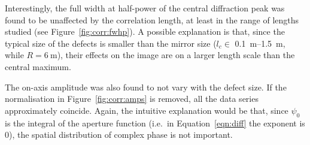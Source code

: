 \documentclass{article}
\begin{document}
Interestingly, the full width at half-power of the central diffraction peak was found to be unaffected by the correlation length, at least in the range of lengths studied (see Figure~\ref{fig:corr:fwhp}). A possible explanation is that, since the typical size of the defects is smaller than the mirror size ($l_c \in$ \SIrange{0.1}{1.5}{\metre}, while $R = \SI{6}{\metre}$), their effects on the image are on a larger length scale than the central maximum.

The on-axis amplitude was also found to not vary with the defect size. If the normalisation in Figure~\ref{fig:corr:amps} is removed, all the data series approximately coincide. Again, the intuitive explanation would be that, since $\psi_0$ is the integral of the aperture function (i.e.\ in Equation~\ref{eqn:diff} the exponent is $0$), the spatial distribution of complex phase is not important.
\end{document}
